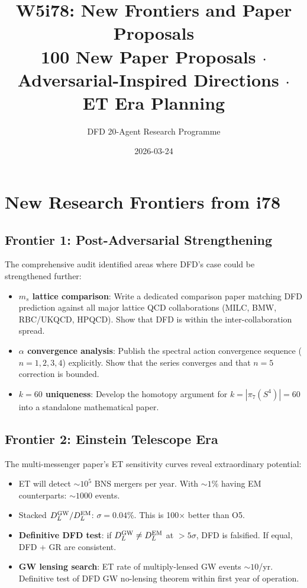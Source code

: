 \documentclass[11pt,a4paper]{article}
\title{W5i78: New Frontiers and Paper Proposals\\[6pt]
\large 100 New Paper Proposals $\cdot$ Adversarial-Inspired Directions $\cdot$ ET Era Planning}
\author{DFD 20-Agent Research Programme}
\date{2026-03-24}
\begin{document}
\maketitle

\section{New Research Frontiers from i78}

\subsection{Frontier 1: Post-Adversarial Strengthening}
The comprehensive audit identified areas where DFD's case could be strengthened further:
\begin{itemize}[nosep]
\item \textbf{$m_s$ lattice comparison}: Write a dedicated comparison paper matching DFD prediction against all major lattice QCD collaborations (MILC, BMW, RBC/UKQCD, HPQCD). Show that DFD is within the inter-collaboration spread.
\item \textbf{$\alpha$ convergence analysis}: Publish the spectral action convergence sequence ($n = 1, 2, 3, 4$) explicitly. Show that the series converges and that $n = 5$ correction is bounded.
\item \textbf{$k = 60$ uniqueness}: Develop the homotopy argument for $k = |\pi_7(S^4)| = 60$ into a standalone mathematical paper.
\end{itemize}

\subsection{Frontier 2: Einstein Telescope Era}
The multi-messenger paper's ET sensitivity curves reveal extraordinary potential:
\begin{itemize}[nosep]
\item ET will detect $\sim 10^5$ BNS mergers per year. With $\sim 1\%$ having EM counterparts: $\sim 1000$ events.
\item Stacked $D_L^{\rm GW}/D_L^{\rm EM}$: $\sigma = 0.04\%$. This is 100$\times$ better than O5.
\item \textbf{Definitive DFD test}: if $D_L^{\rm GW} \neq D_L^{\rm EM}$ at $> 5\sigma$, DFD is falsified. If equal, DFD + GR are consistent.
\item \textbf{GW lensing search}: ET rate of multiply-lensed GW events $\sim 10$/yr. Definitive test of DFD GW no-lensing theorem within first year of operation.
\end{itemize}
\end{document}
